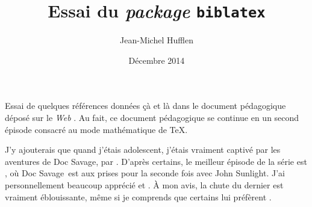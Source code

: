\documentclass{article}
\title{Essai du \foreignlanguage{english}{\emph{package}} \texttt{biblatex}}
\author{Jean-Michel Hufflen}
\date{Décembre 2014}
\newcommand{\ds}{\foreignlanguage{english}{Doc Savage}}
\begin{document}
\maketitle

Essai de quelques références \cite{kurland1977,lint2002} données çà et là dans
le document pédagogique déposé sur le \foreignlanguage{english}{\emph{Web}}
\cite{h2006}. Au fait, ce document pédagogique se continue en un second épisode
\cite{h2006a} consacré au mode mathématique de \TeX.

J'y ajouterais que quand j'étais adolescent, j'étais vraiment captivé par les
aventures de \ds, par \foreignlanguage{english}{\citeauthor{robeson1968j}}.
D'après certains, le meilleur épisode de la série est
\foreignlanguage{english}{} \cite{robeson1974c}, où
\ds\ est aux prises pour la seconde fois avec \foreignlanguage{english}{John
Sunlight}. J'ai personnellement beaucoup apprécié
\foreignlanguage{english}{} et
\foreignlanguage{english}{}
\cite{robeson1968g,robeson1968j}. \`{A} mon avis, la chute du dernier
\cite{robeson1968j} est vraiment éblouissante, même si je comprends que
certains lui préfèrent \foreignlanguage{english}{}
\cite{robeson1974c}.

\printbibliography
\end{document}
